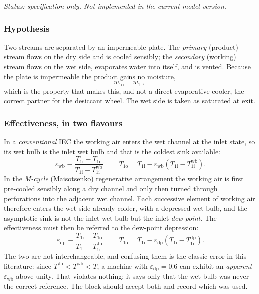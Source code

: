 \documentclass[11pt]{article}
\begin{document}
\emph{Status: specification only. Not implemented in the current model version.}

\subsubsection{Hypothesis}
Two streams are separated by an impermeable plate. The \emph{primary} (product) stream flows on the
dry side and is cooled sensibly; the \emph{secondary} (working) stream flows on the wet side,
evaporates water into itself, and is vented. Because the plate is impermeable the product gains no
moisture,
\begin{equation}
w_{\mathrm{1o}} = w_{\mathrm{1i}} ,
\label{eq:spec:iecw}
\end{equation}
which is the property that makes this, and not a direct evaporative cooler, the correct partner for
the desiccant wheel. The wet side is taken as saturated at exit.

\subsubsection{Effectiveness, in two flavours}
In a \emph{conventional} IEC the working air enters the wet channel at the inlet state, so its wet
bulb is the inlet wet bulb and that is the coldest sink available:
\begin{equation}
\boxed{\;
\varepsilon_{\mathrm{wb}} \equiv
\frac{T_{\mathrm{1i}}-T_{\mathrm{1o}}}{T_{\mathrm{1i}}-T_{\mathrm{1i}}^{\mathrm{wb}}}\;}
\qquad
T_{\mathrm{1o}} = T_{\mathrm{1i}} - \varepsilon_{\mathrm{wb}}
 \left(T_{\mathrm{1i}}-T_{\mathrm{1i}}^{\mathrm{wb}}\right) .
\label{eq:spec:iecwb}
\end{equation}
In the \emph{M-cycle} (Maisotsenko) regenerative arrangement the working air is first pre-cooled
sensibly along a dry channel and only then turned through perforations into the adjacent wet channel.
Each successive element of working air therefore enters the wet side already colder, with a depressed
wet bulb, and the asymptotic sink is not the inlet wet bulb but the inlet \emph{dew point}. The
effectiveness must then be referred to the dew-point depression:
\begin{equation}
\boxed{\;
\varepsilon_{\mathrm{dp}} \equiv
\frac{T_{\mathrm{1i}}-T_{\mathrm{1o}}}{T_{\mathrm{1i}}-T_{\mathrm{1i}}^{\mathrm{dp}}}\;}
\qquad
T_{\mathrm{1o}} = T_{\mathrm{1i}} - \varepsilon_{\mathrm{dp}}
 \left(T_{\mathrm{1i}}-T_{\mathrm{1i}}^{\mathrm{dp}}\right) .
\label{eq:spec:iecdp}
\end{equation}
The two are not interchangeable, and confusing them is the classic error in this literature: since
$T^{\mathrm{dp}} < T^{\mathrm{wb}} < T$, a machine with $\varepsilon_{\mathrm{dp}}=0.6$ can exhibit an
\emph{apparent} $\varepsilon_{\mathrm{wb}}$ above unity. That violates nothing; it says only that the
wet bulb was never the correct reference. The block should accept both and record which was used.
\end{document}
